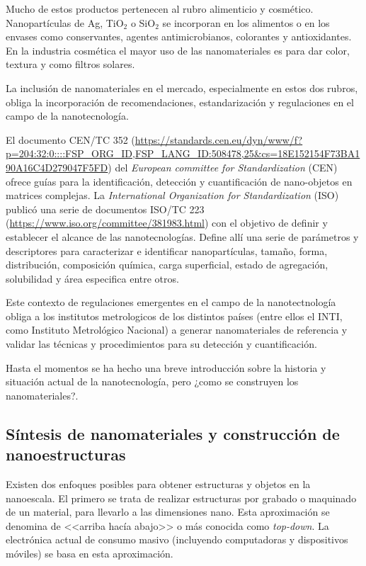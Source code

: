  	Mucho de estos productos pertenecen al rubro alimenticio y cosmético. Nanopartículas de Ag, TiO$_2$ o SiO$_2$ se incorporan en los alimentos o en los envases como conservantes, agentes antimicrobianos, colorantes y antioxidantes. En la industria cosmética el mayor uso de las nanomateriales es para dar color, textura y como filtros solares.
 	
 	La inclusión de nanomateriales en el mercado, especialmente en estos dos rubros, obliga la incorporación de recomendaciones, estandarización y regulaciones en el campo de la nanotecnología.  

 	El documento CEN/TC 352 (\url{https://standards.cen.eu/dyn/www/f?p=204:32:0::::FSP_ORG_ID,FSP_LANG_ID:508478,25&cs=18E152154F73BA190A16C4D279047F5FD}) del \textit{European committee for Standardization} (CEN) ofrece guías para la identificación, detección y cuantificación de nano-objetos en matrices complejas. La \textit{International Organization for Standardization} (ISO) publicó una serie de documentos ISO/TC 223 (\url{https://www.iso.org/committee/381983.html}) con el objetivo de definir y establecer el alcance de las nanotecnologías. Define allí una serie de parámetros y descriptores para caracterizar e identificar nanopartículas, tamaño, forma, distribución, composición química, carga superficial, estado de agregación, solubilidad y área especifica entre otros.

 	Este contexto de regulaciones emergentes en el campo de la nanotectnología obliga a los institutos metrologicos de los distintos países (entre ellos el INTI, como Instituto Metrológico Nacional) a generar nanomateriales de referencia y validar las técnicas y procedimientos para su detección y cuantificación.

 	Hasta el momentos se ha hecho una breve introducción sobre la historia y situación actual de la nanotecnología, pero ¿como se construyen los nanomateriales?.

	
 	\subsection{Síntesis de nanomateriales y construcción de nanoestructuras}

	Existen dos enfoques posibles para obtener estructuras y objetos en la nanoescala. El primero se trata de realizar estructuras por grabado o maquinado de un material, para llevarlo a las dimensiones nano. Esta aproximación se denomina de <<arriba hacía abajo>> o más conocida como \textit{top-down}. La electrónica actual de consumo masivo (incluyendo computadoras y dispositivos móviles) se basa en esta aproximación. 

